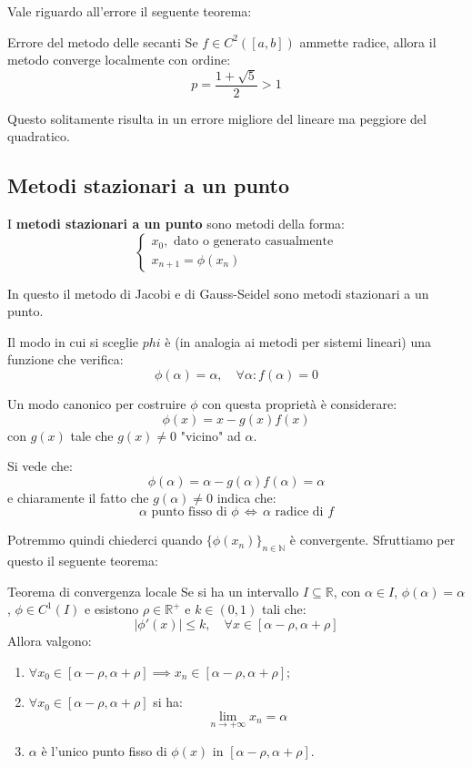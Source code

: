 \documentclass[a4paper,11pt]{article}
\begin{document}
Vale riguardo all'errore il seguente teorema:
\begin{theorem}{Errore del metodo delle secanti}
	Se $f \in C^2([a, b])$ ammette radice, allora il metodo converge  localmente con ordine:
	$$
		p = \frac{1 + \sqrt{5}}{2} > 1
	$$
\end{theorem}

Questo solitamente risulta in un errore migliore del lineare ma peggiore del quadratico.

\subsection{Metodi stazionari a un punto}
I \textbf{metodi stazionari a un punto} sono metodi della forma:
\[
	\begin{cases}
		x_0, \text{ dato o generato casualmente} \\
		x_{n + 1} = \phi(x_n)
	\end{cases}
\]

In questo il metodo di Jacobi e di Gauss-Seidel sono metodi stazionari a un punto.

Il modo in cui si sceglie $phi$ è (in analogia ai metodi per sistemi lineari) una funzione che verifica:
$$
\phi(\alpha) = \alpha, \quad \forall \alpha : f(\alpha) = 0
$$

Un modo canonico per costruire $\phi$ con questa proprietà è considerare:
$$
\phi(x) = x - g(x) f(x)
$$
con $g(x)$ tale che $g(x) \neq 0$ "vicino" ad $\alpha$.

Si vede che:
$$
\phi(\alpha) = \alpha - g(\alpha) f(\alpha) = \alpha
$$
e chiaramente il fatto che $g(\alpha) \neq 0$ indica che:
$$
\alpha \text{ punto fisso di $\phi$} \, \Leftrightarrow \, \alpha \text{ radice di $f$}
$$

Potremmo quindi chiederci quando $\{ \phi(x_n) \}_{n \in \mathbb{N}}$ è convergente.
Sfruttiamo per questo il seguente teorema:
\begin{theorem}{Teorema di convergenza locale}
	Se si ha un intervallo $I \subseteq \mathbb{R}$, con $\alpha \in I$, $\phi(\alpha) = \alpha$, $\phi \in C^1(I)$ e esistono $\rho \in \mathbb{R}^+$ e $k \in (0, 1)$ tali che:
	$$
	|\phi'(x)| \leq k, \quad \forall x \in [\alpha - \rho, \alpha + \rho]
	$$
	Allora valgono:
	\begin{enumerate}
		\item $\forall x_0 \in [\alpha - \rho, \alpha + \rho] \implies x_n \in [\alpha - \rho, \alpha + \rho]$;
		\item $\forall x_0 \in [\alpha - \rho, \alpha + \rho]$ si ha:
			$$
				\lim_{n \rightarrow + \infty} x_n = \alpha
			$$
		\item $\alpha$ è l'unico punto fisso di $\phi(x)$ in $[\alpha - \rho, \alpha + \rho]$.
	\end{enumerate}
\end{theorem}
\end{document}
